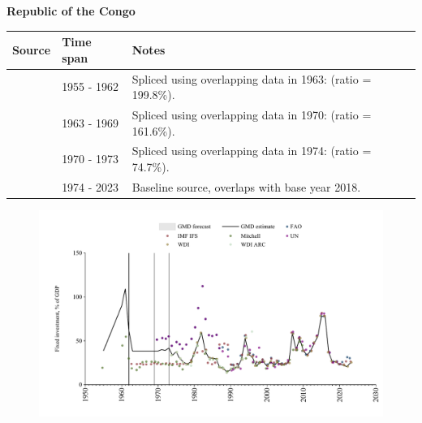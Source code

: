 \documentclass[12pt,a4paper,landscape]{article}
\begin{document}
\begin{adjustbox}{max totalsize={\paperwidth}{\paperheight},center}
\begin{minipage}[t][\textheight][t]{\textwidth}
\vspace*{0.5cm}
{}
\begin{center}
{\Large\bfseries Republic of the Congo}
\end{center}
\vspace{0.5cm}
\begin{table}[H]
\centering
\small
\begin{tabular}{|l|l|l|}
\hline
\textbf{Source} & \textbf{Time span} & \textbf{Notes} \\
\hline
\rowcolor{white}\cite{Mitchell}& 1955 - 1962 &Spliced using overlapping data in 1963: (ratio = 199.8\%).\\
\rowcolor{lightgray}\cite{IMF_IFS}& 1963 - 1969 &Spliced using overlapping data in 1970: (ratio = 161.6\%).\\
\rowcolor{white}\cite{UN}& 1970 - 1973 &Spliced using overlapping data in 1974: (ratio = 74.7\%).\\
\rowcolor{lightgray}\cite{WDI}& 1974 - 2023 &Baseline source, overlaps with base year 2018.\\
\hline
\end{tabular}
\end{table}
\begin{figure}[H]
\centering
\includegraphics[width=\textwidth,height=0.6\textheight,keepaspectratio]{graphs/COG_finv_GDP.pdf}
\end{figure}
\end{minipage}
\end{adjustbox}
\end{document}
